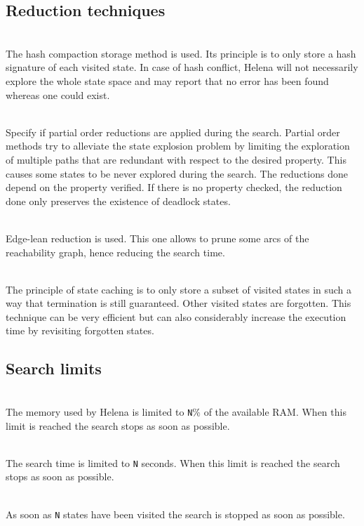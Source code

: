 \subsection{Reduction techniques}
\begin{description}
\item{}\\ The hash
  compaction storage method is used.  Its principle is to only store a
  hash signature of each visited state.  In case of hash conflict,
  Helena will not necessarily explore the whole state space and may
  report that no error has been found whereas one could exist.
\item{}\\ Specify if
  partial order reductions are applied during the search.  Partial
  order methods try to alleviate the state explosion problem by
  limiting the exploration of multiple paths that are redundant with
  respect to the desired property.  This causes some states to be
  never explored during the search.  The reductions done depend on the
  property verified.  If there is no property checked, the reduction
  done only preserves the existence of deadlock states.
\item{}\\ Edge-lean
  reduction is used.  This one allows to prune some arcs of the
  reachability graph, hence reducing the search time.
\item{}\\ The principle
  of state caching is to only store a subset of visited states in such
  a way that termination is still guaranteed.  Other visited states
  are forgotten.  This technique can be very efficient but can also
  considerably increase the execution time by revisiting forgotten
  states.
\end{description}

\subsection{Search limits}
\label{subsection:limits}
\begin{description}
\item{}\\ The memory used by Helena is
  limited to \texttt{N}\% of the available RAM.  When this limit is
  reached the search stops as soon as possible.
\item{}\\ The search time is limited to
  \texttt{N} seconds.  When this limit is reached the search stops as
  soon as possible.
\item{}\\ As soon as \texttt{N} states
  have been visited the search is stopped as soon as possible.
\end{description}


